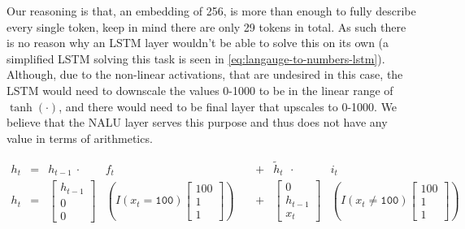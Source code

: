 Our reasoning is that, an embedding of 256, is more than enough to fully describe every single token, keep in mind there are only 29 tokens in total. As such there is no reason why an LSTM layer wouldn't be able to solve this on its own (a simplified LSTM solving this task is seen in \eqref{eq:langauge-to-numbers-lstm}). Although, due to the non-linear activations, that are undesired in this case, the LSTM would need to downscale the values 0-1000 to be in the linear range of $\tanh(\cdot)$, and there would need to be final layer that upscales to 0-1000. We believe that the NALU layer serves this purpose and thus does not have any value in terms of arithmetics.

\begin{equation}
\begin{aligned}
h_t &= &h_{t-1}\ \cdot\ &f_t &&+ &\tilde{h}_{t}\ \ \cdot\ &i_t \\
h_t &= &\begin{bmatrix}
 h_{t-1} \\
 0 \\
 0
\end{bmatrix} &\left(I(x_t = \texttt{100})\begin{bmatrix}100 \\ 1 \\ 1\end{bmatrix}\right)\ &&+ &\begin{bmatrix}
 0 \\
 h_{t-1} \\
 x_t
\end{bmatrix} &\left(I(x_t \not= \texttt{100})\begin{bmatrix}100 \\ 1 \\ 1\end{bmatrix}\right)
\end{aligned}
\label{eq:langauge-to-numbers-lstm}
\end{equation}
